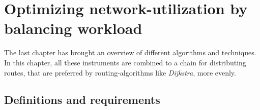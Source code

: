 \chapter{Optimizing network-utilization by balancing workload}
\label{chap:balancing}

The last chapter has brought an overview of different algorithms and techniques.
In this chapter, all these instruments are combined to a chain for distributing routes, that are preferred by routing-algorithms like \textit{Dijkstra}, more evenly.

\section{Definitions and requirements}




